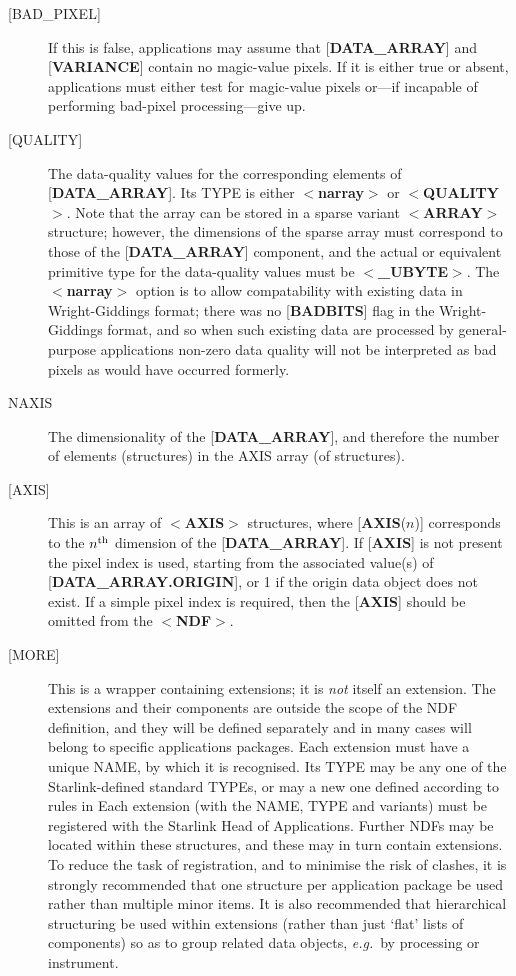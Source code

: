 \begin{description}
\item [{[}BAD\_PIXEL{]}]  If this
is false, applications may assume that
{[}{\bf DATA\_ARRAY}{]} and {[}{\bf VARIANCE}{]} contain no magic-value
pixels. If it is either true or absent, applications
must either test for magic-value pixels or---if incapable
of performing bad-pixel processing---give up.
\item [{[}QUALITY{]}]  The data-quality values for the
corresponding elements of {[}{\bf DATA\_ARRAY}{]}.
Its TYPE is either $<${\bf narray}$>$ or $<${\bf QUALITY}$>$.
Note that the array can be stored
in a sparse variant \mbox{$<${\bf ARRAY}$>$} structure;
however, the dimensions of the sparse array must correspond to those of the
{[}{\bf DATA\_ARRAY}{]} component, and the actual or equivalent
primitive type for the data-quality values must be $<${\bf \_UBYTE}$>$.
The $<${\bf narray}$>$ option is to allow compatability with existing data in
Wright-Giddings format; there was no
{[}{\bf BADBITS}{]} flag in the Wright-Giddings format,
and so when such existing data are processed by
general-purpose applications
non-zero data quality will not be interpreted as
bad pixels as would have occurred formerly.
\item [NAXIS]  The dimensionality of
the {[}{\bf DATA\_ARRAY}{]}, and therefore
the number of elements (structures) in the AXIS array
(of structures).
\item [{[}AXIS{]}] This is an array of $<${\bf AXIS}$>$ structures, where
{[}{\bf AXIS}($n$){]} corresponds to the $n^{\rm th}$ dimension of the
{[}{\bf DATA\_ARRAY}{]}.
If {[}{\bf AXIS}{]} is not present the pixel index is used, starting
from the associated value(s) of {[}{\bf DATA\_ARRAY.ORIGIN}{]}, or 1 if the
origin data object does not exist. If a simple pixel index is required,
then the {[}{\bf AXIS}{]} should be omitted from the $<${\bf NDF}$>$.
\item [{[}MORE{]}]  This is a wrapper containing extensions; it is {\em 
not} itself an extension. The extensions and their components
are outside the scope of the NDF definition, and they will
be defined separately and in many cases will belong
to specific applications packages.
Each extension must have a unique NAME, by which it is recognised.
Its TYPE may be any one of the Starlink-defined standard TYPEs, or
may a new one defined according to rules in 
Each extension (with the NAME, TYPE and variants)
must be registered with the Starlink Head of Applications.
Further NDFs may be located within these structures, and these
may in turn contain extensions.  To reduce the task of registration,
and to minimise the risk of clashes, it is strongly recommended
that one structure per application package be used rather than multiple
minor items. It is also recommended that hierarchical structuring be used
within extensions (rather than just `flat' lists of components)
so as to group related data objects, {\it e.g.}\  by
processing or instrument.  
\end{description}

